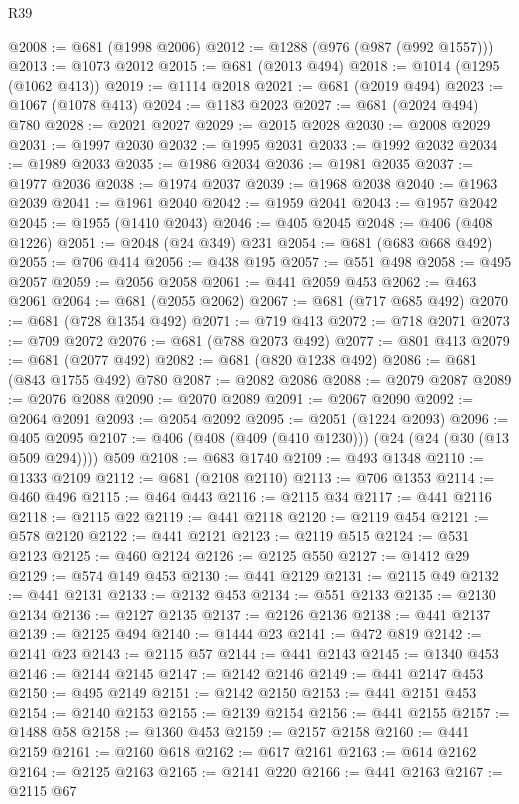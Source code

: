 \begin{lexlean}{R39}
\begin{coremodule}
@2008 := @681 (@1998 @2006)
@2012 := @1288 (@976 (@987 (@992 @1557)))
@2013 := @1073 @2012
@2015 := @681 (@2013 @494)
@2018 := @1014 (@1295 (@1062 @413))
@2019 := @1114 @2018
@2021 := @681 (@2019 @494)
@2023 := @1067 (@1078 @413)
@2024 := @1183 @2023
@2027 := @681 (@2024 @494) @780
@2028 := @2021 @2027
@2029 := @2015 @2028
@2030 := @2008 @2029
@2031 := @1997 @2030
@2032 := @1995 @2031
@2033 := @1992 @2032
@2034 := @1989 @2033
@2035 := @1986 @2034
@2036 := @1981 @2035
@2037 := @1977 @2036
@2038 := @1974 @2037
@2039 := @1968 @2038
@2040 := @1963 @2039
@2041 := @1961 @2040
@2042 := @1959 @2041
@2043 := @1957 @2042
@2045 := @1955 (@1410 @2043)
@2046 := @405 @2045
@2048 := @406 (@408 @1226)
@2051 := @2048 (@24 @349) @231
@2054 := @681 (@683 @668 @492)
@2055 := @706 @414
@2056 := @438 @195
@2057 := @551 @498
@2058 := @495 @2057
@2059 := @2056 @2058
@2061 := @441 @2059 @453
@2062 := @463 @2061
@2064 := @681 (@2055 @2062)
@2067 := @681 (@717 @685 @492)
@2070 := @681 (@728 @1354 @492)
@2071 := @719 @413
@2072 := @718 @2071
@2073 := @709 @2072
@2076 := @681 (@788 @2073 @492)
@2077 := @801 @413
@2079 := @681 (@2077 @492)
@2082 := @681 (@820 @1238 @492)
@2086 := @681 (@843 @1755 @492) @780
@2087 := @2082 @2086
@2088 := @2079 @2087
@2089 := @2076 @2088
@2090 := @2070 @2089
@2091 := @2067 @2090
@2092 := @2064 @2091
@2093 := @2054 @2092
@2095 := @2051 (@1224 @2093)
@2096 := @405 @2095
@2107 := @406 (@408 (@409 (@410 @1230))) (@24 (@24 (@30 (@13 @509 @294)))) @509
@2108 := @683 @1740
@2109 := @493 @1348
@2110 := @1333 @2109
@2112 := @681 (@2108 @2110)
@2113 := @706 @1353
@2114 := @460 @496
@2115 := @464 @443
@2116 := @2115 @34
@2117 := @441 @2116
@2118 := @2115 @22
@2119 := @441 @2118
@2120 := @2119 @454
@2121 := @578 @2120
@2122 := @441 @2121
@2123 := @2119 @515
@2124 := @531 @2123
@2125 := @460 @2124
@2126 := @2125 @550
@2127 := @1412 @29
@2129 := @574 @149 @453
@2130 := @441 @2129
@2131 := @2115 @49
@2132 := @441 @2131
@2133 := @2132 @453
@2134 := @551 @2133
@2135 := @2130 @2134
@2136 := @2127 @2135
@2137 := @2126 @2136
@2138 := @441 @2137
@2139 := @2125 @494
@2140 := @1444 @23
@2141 := @472 @819
@2142 := @2141 @23
@2143 := @2115 @57
@2144 := @441 @2143
@2145 := @1340 @453
@2146 := @2144 @2145
@2147 := @2142 @2146
@2149 := @441 @2147 @453
@2150 := @495 @2149
@2151 := @2142 @2150
@2153 := @441 @2151 @453
@2154 := @2140 @2153
@2155 := @2139 @2154
@2156 := @441 @2155
@2157 := @1488 @58
@2158 := @1360 @453
@2159 := @2157 @2158
@2160 := @441 @2159
@2161 := @2160 @618
@2162 := @617 @2161
@2163 := @614 @2162
@2164 := @2125 @2163
@2165 := @2141 @220
@2166 := @441 @2163
@2167 := @2115 @67

\end{coremodule}
\end{lexlean}
